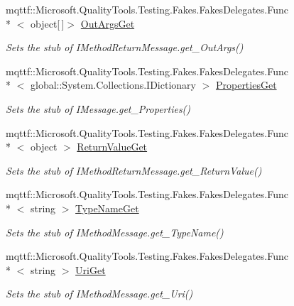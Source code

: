 \begin{DoxyCompactItemize}
mqttf\-::\-Microsoft.\-Quality\-Tools.\-Testing.\-Fakes.\-Fakes\-Delegates.\-Func\\*
$<$ object\mbox{[}$\,$\mbox{]}$>$ \hyperlink{class_system_1_1_runtime_1_1_remoting_1_1_messaging_1_1_fakes_1_1_stub_i_method_return_message_a4f6e0b943f0506feb332cbef0c77b070}{Out\-Args\-Get}
\begin{DoxyCompactList}\small\item\em Sets the stub of I\-Method\-Return\-Message.\-get\-\_\-\-Out\-Args()\end{DoxyCompactList}\item 
mqttf\-::\-Microsoft.\-Quality\-Tools.\-Testing.\-Fakes.\-Fakes\-Delegates.\-Func\\*
$<$ global\-::\-System.\-Collections.\-I\-Dictionary $>$ \hyperlink{class_system_1_1_runtime_1_1_remoting_1_1_messaging_1_1_fakes_1_1_stub_i_method_return_message_a746fbb538730cacb9c61c69e68f1c40d}{Properties\-Get}
\begin{DoxyCompactList}\small\item\em Sets the stub of I\-Message.\-get\-\_\-\-Properties()\end{DoxyCompactList}\item 
mqttf\-::\-Microsoft.\-Quality\-Tools.\-Testing.\-Fakes.\-Fakes\-Delegates.\-Func\\*
$<$ object $>$ \hyperlink{class_system_1_1_runtime_1_1_remoting_1_1_messaging_1_1_fakes_1_1_stub_i_method_return_message_a2931a10fcdf0e5be60eb97464ba2038e}{Return\-Value\-Get}
\begin{DoxyCompactList}\small\item\em Sets the stub of I\-Method\-Return\-Message.\-get\-\_\-\-Return\-Value()\end{DoxyCompactList}\item 
mqttf\-::\-Microsoft.\-Quality\-Tools.\-Testing.\-Fakes.\-Fakes\-Delegates.\-Func\\*
$<$ string $>$ \hyperlink{class_system_1_1_runtime_1_1_remoting_1_1_messaging_1_1_fakes_1_1_stub_i_method_return_message_ab1167ca1915e5e3b26319cb96e3021d7}{Type\-Name\-Get}
\begin{DoxyCompactList}\small\item\em Sets the stub of I\-Method\-Message.\-get\-\_\-\-Type\-Name()\end{DoxyCompactList}\item 
mqttf\-::\-Microsoft.\-Quality\-Tools.\-Testing.\-Fakes.\-Fakes\-Delegates.\-Func\\*
$<$ string $>$ \hyperlink{class_system_1_1_runtime_1_1_remoting_1_1_messaging_1_1_fakes_1_1_stub_i_method_return_message_aaa8aa291a9c63bcc66b3df7f7c9f5e0a}{Uri\-Get}
\begin{DoxyCompactList}\small\item\em Sets the stub of I\-Method\-Message.\-get\-\_\-\-Uri()\end{DoxyCompactList}\end{DoxyCompactItemize}


